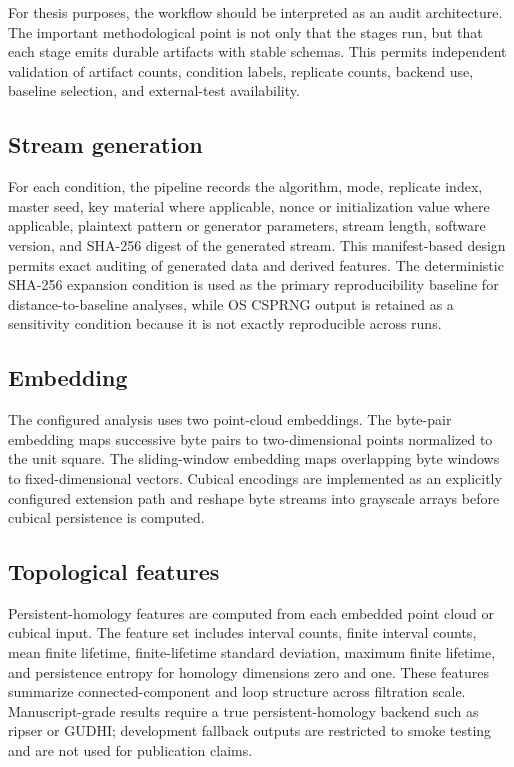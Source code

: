 For thesis purposes, the workflow should be interpreted as an audit architecture. The important methodological point is not only that the stages run, but that each stage emits durable artifacts with stable schemas. This permits independent validation of artifact counts, condition labels, replicate counts, backend use, baseline selection, and external-test availability.

\subsection{Stream generation}
\label{subsec:stream-generation}

For each condition, the pipeline records the algorithm, mode, replicate index, master seed, key material where applicable, nonce or initialization value where applicable, plaintext pattern or generator parameters, stream length, software version, and SHA-256 digest of the generated stream. This manifest-based design permits exact auditing of generated data and derived features. The deterministic SHA-256 expansion condition is used as the primary reproducibility baseline for distance-to-baseline analyses, while OS CSPRNG output is retained as a sensitivity condition because it is not exactly reproducible across runs.

\subsection{Embedding}
\label{subsec:embedding}

The configured analysis uses two point-cloud embeddings. The byte-pair embedding maps successive byte pairs to two-dimensional points normalized to the unit square. The sliding-window embedding maps overlapping byte windows to fixed-dimensional vectors. Cubical encodings are implemented as an explicitly configured extension path and reshape byte streams into grayscale arrays before cubical persistence is computed.

\subsection{Topological features}
\label{subsec:topological-features}

Persistent-homology features are computed from each embedded point cloud or cubical input. The feature set includes interval counts, finite interval counts, mean finite lifetime, finite-lifetime standard deviation, maximum finite lifetime, and persistence entropy for homology dimensions zero and one. These features summarize connected-component and loop structure across filtration scale. Manuscript-grade results require a true persistent-homology backend such as ripser or GUDHI; development fallback outputs are restricted to smoke testing and are not used for publication claims.

